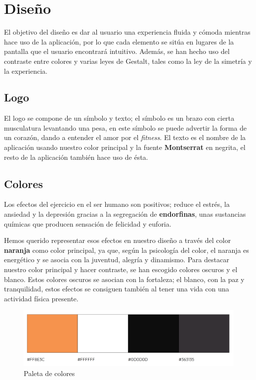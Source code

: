 \documentclass[12pt,a4paper]{article}
\begin{document}
\newpage

\section{Diseño}
El objetivo del diseño es dar al usuario una experiencia fluida y cómoda mientras hace uso de la aplicación, por lo que cada elemento se sitúa en lugares de la pantalla que el usuario encontrará intuitivo.
Además, se han hecho uso del contraste entre colores y varias leyes de Gestalt, tales como la ley de la simetría y la experiencia.

\subsection{Logo}
El logo se compone de un símbolo y texto; el símbolo es un brazo con cierta musculatura levantando una pesa, en este símbolo se puede advertir la forma de un corazón, dando a entender el amor por el \textit{fitness}.
El texto es el nombre de la aplicación usando nuestro color principal y la fuente \textbf{Montserrat} en negrita, el resto de la aplicación también hace uso de ésta.


\subsection{Colores}

Los efectos del ejercicio en el ser humano son positivos; reduce el estrés, la ansiedad y la depresión gracias a la segregación de \textbf{endorfinas}, unas sustancias químicas que producen sensación de felicidad y euforia.

Hemos querido representar esos efectos en nuestro diseño a través del color \textbf{naranja} como color principal, ya que, según la psicología del color, el naranja es energético y se asocia con la juventud, alegría y dinamismo.
Para destacar nuestro color principal y hacer contraste, se han escogido colores oscuros y el blanco. Estos colores oscuros se asocian con la fortaleza; el blanco, con la paz y tranquilidad, estos efectos se consiguen también al tener una vida con una actividad física presente.

\begin{figure}[h]
  \centering
 \includegraphics[width=1\textwidth]{color_palette}
 \caption{Paleta de colores}
\end{figure}
\end{document}
